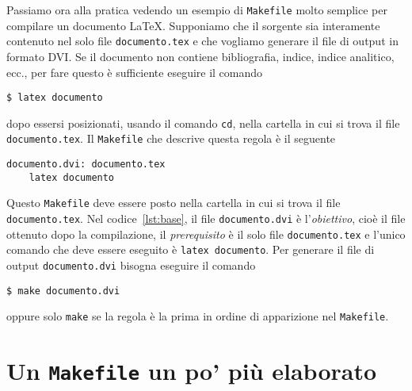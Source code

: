 Passiamo ora alla pratica vedendo un esempio di \texttt{Makefile} molto semplice
per compilare un documento \LaTeX{}.
Supponiamo che il sorgente sia interamente contenuto nel solo file
\texttt{documento.tex} e che vogliamo generare il file di output in formato DVI.
Se il documento non contiene bibliografia, indice, indice analitico, ecc., per
fare questo è sufficiente eseguire il comando
\begin{verbatim}
$ latex documento
\end{verbatim} %
dopo essersi posizionati, usando il comando \texttt{cd}, nella cartella in cui
si trova il file \texttt{documento.tex}.  Il \texttt{Makefile} che descrive
questa regola è il seguente
\begin{lstlisting}[caption={Un semplice \texttt{Makefile}.},label=lst:base]
documento.dvi: documento.tex
	latex documento
\end{lstlisting}
Questo \texttt{Makefile} deve essere posto nella cartella in cui si trova il
file \texttt{documento.tex}.  Nel codice~\ref{lst:base}, il file
\texttt{documento.dvi} è l'\emph{obiettivo}, cioè il file ottenuto dopo la
compilazione, il \emph{prerequisito} è il solo file \texttt{documento.tex} e
l'unico comando che deve essere eseguito è \texttt{latex documento}.  Per
generare il file di output \texttt{documento.dvi} bisogna eseguire il comando
\begin{verbatim}
$ make documento.dvi
\end{verbatim} %
oppure solo \texttt{make} se la regola è la prima in ordine di apparizione nel
\texttt{Makefile}.

\section{Un \texttt{Makefile} un po' più elaborato}
\label{sec:makefile-elaborato}

